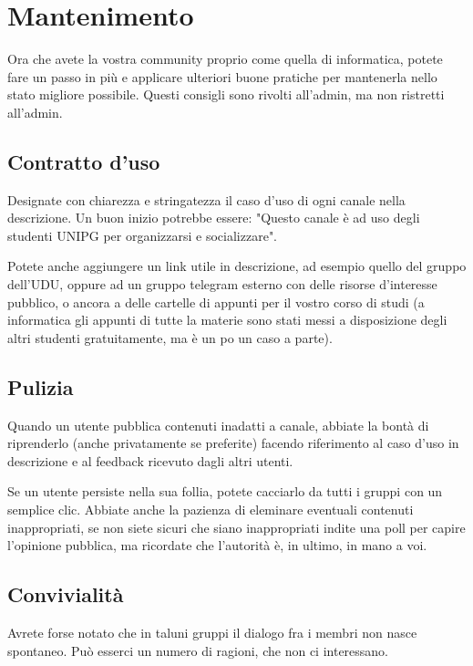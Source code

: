\documentclass{article}
\begin{document}
\section{Mantenimento}

Ora che avete la vostra community proprio come quella di informatica, potete fare un passo in più e applicare ulteriori buone pratiche per mantenerla nello stato migliore possibile. Questi consigli sono rivolti all'admin, ma non ristretti all'admin.

\subsection{Contratto d'uso}

Designate con chiarezza e stringatezza il caso d'uso di ogni canale nella descrizione. Un buon inizio potrebbe essere: "Questo canale è ad uso degli studenti UNIPG per organizzarsi e socializzare".

Potete anche aggiungere un link utile in descrizione, ad esempio quello del gruppo dell'UDU, oppure ad un gruppo telegram esterno con delle risorse d'interesse pubblico, o ancora a delle cartelle di appunti per il vostro corso di studi (a informatica gli appunti di tutte la materie sono stati messi a disposizione degli altri studenti gratuitamente, ma è un po un caso a parte).

\subsection {Pulizia}

Quando un utente pubblica contenuti inadatti a canale, abbiate la bontà di riprenderlo (anche privatamente se preferite) facendo riferimento al caso d'uso in descrizione e al feedback ricevuto dagli altri utenti.

Se un utente persiste nella sua follia, potete cacciarlo da tutti i gruppi con un semplice clic. Abbiate anche la pazienza di eleminare eventuali contenuti inappropriati, se non siete sicuri che siano inappropriati indite una poll per capire l'opinione pubblica, ma ricordate che l'autorità è, in ultimo, in mano a voi.

\subsection{Convivialità}

Avrete forse notato che in taluni gruppi il dialogo fra i membri non nasce spontaneo. Può esserci un numero di ragioni, che non ci interessano.
\end{document}
